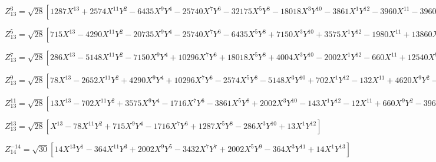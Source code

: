 \documentclass[10pt,landscape]{article}
\begin{document}
\vspace{1.2 mm}
\noindent $ Z^{3}_{13} = \sqrt{28} [1287X^{13} +2574X^{11}Y^{2} -6435X^{9}Y^{4} -25740X^{7}Y^{6} -32175X^{5}Y^{8} -18018X^{3}Y^{10} -3861X^{1}Y^{12} -3960X^{11} -3960X^{9}Y^{2} +23760X^{7}Y^{4} +55440X^{5}Y^{6} +43560X^{3}Y^{8} +11880X^{1}Y^{10} +4620X^{9} -27720X^{5}Y^{4} -36960X^{3}Y^{6} -13860X^{1}Y^{8} -2520X^{7} +2520X^{5}Y^{2} +12600X^{3}Y^{4} +7560X^{1}Y^{6} +630X^{5} -1260X^{3}Y^{2} -1890X^{1}Y^{4} -56X^{3} +168X^{1}Y^{2}] $

\vspace{1.2 mm}
\noindent $ Z^{5}_{13} = \sqrt{28} [715X^{13} -4290X^{11}Y^{2} -20735X^{9}Y^{4} -25740X^{7}Y^{6} -6435X^{5}Y^{8} +7150X^{3}Y^{10} +3575X^{1}Y^{12} -1980X^{11} +13860X^{9}Y^{2} +43560X^{7}Y^{4} +27720X^{5}Y^{6} -9900X^{3}Y^{8} -9900X^{1}Y^{10} +1980X^{9} -15840X^{7}Y^{2} -27720X^{5}Y^{4} +9900X^{1}Y^{8} -840X^{7} +7560X^{5}Y^{2} +4200X^{3}Y^{4} -4200X^{1}Y^{6} +126X^{5} -1260X^{3}Y^{2} +630X^{1}Y^{4}] $

\vspace{1.2 mm}
\noindent $ Z^{7}_{13} = \sqrt{28} [286X^{13} -5148X^{11}Y^{2} -7150X^{9}Y^{4} +10296X^{7}Y^{6} +18018X^{5}Y^{8} +4004X^{3}Y^{10} -2002X^{1}Y^{12} -660X^{11} +12540X^{9}Y^{2} +3960X^{7}Y^{4} -27720X^{5}Y^{6} -13860X^{3}Y^{8} +4620X^{1}Y^{10} +495X^{9} -9900X^{7}Y^{2} +6930X^{5}Y^{4} +13860X^{3}Y^{6} -3465X^{1}Y^{8} -120X^{7} +2520X^{5}Y^{2} -4200X^{3}Y^{4} +840X^{1}Y^{6}] $

\vspace{1.2 mm}
\noindent $ Z^{9}_{13} = \sqrt{28} [78X^{13} -2652X^{11}Y^{2} +4290X^{9}Y^{4} +10296X^{7}Y^{6} -2574X^{5}Y^{8} -5148X^{3}Y^{10} +702X^{1}Y^{12} -132X^{11} +4620X^{9}Y^{2} -11880X^{7}Y^{4} -5544X^{5}Y^{6} +9900X^{3}Y^{8} -1188X^{1}Y^{10} +55X^{9} -1980X^{7}Y^{2} +6930X^{5}Y^{4} -4620X^{3}Y^{6} +495X^{1}Y^{8}] $

\vspace{1.2 mm}
\noindent $ Z^{11}_{13} = \sqrt{28} [13X^{13} -702X^{11}Y^{2} +3575X^{9}Y^{4} -1716X^{7}Y^{6} -3861X^{5}Y^{8} +2002X^{3}Y^{10} -143X^{1}Y^{12} -12X^{11} +660X^{9}Y^{2} -3960X^{7}Y^{4} +5544X^{5}Y^{6} -1980X^{3}Y^{8} +132X^{1}Y^{10}] $

\vspace{1.2 mm}
\noindent $ Z^{13}_{13} = \sqrt{28} [X^{13} -78X^{11}Y^{2} +715X^{9}Y^{4} -1716X^{7}Y^{6} +1287X^{5}Y^{8} -286X^{3}Y^{10} +13X^{1}Y^{12}] $

\vspace{1.2 mm}
\noindent $ Z^{-14}_{14} = \sqrt{30} [14X^{13}Y^{1} -364X^{11}Y^{3} +2002X^{9}Y^{5} -3432X^{7}Y^{7} +2002X^{5}Y^{9} -364X^{3}Y^{11} +14X^{1}Y^{13}] $
\end{document}
